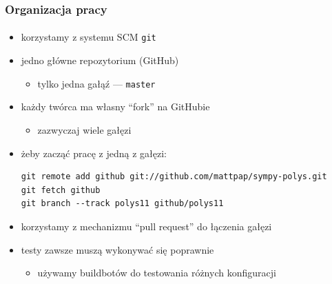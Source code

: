 \documentclass[10pt]{beamer}
\begin{document}
\begin{frame}[fragile]
    \frametitle{Organizacja pracy}
    \framesubtitle{}

    \begin{itemize}
        \item korzystamy z systemu SCM \texttt{git}
        \pause
        \item jedno główne repozytorium (GitHub)
            \begin{itemize}
                \item tylko jedna gałąź --- \texttt{master}
            \end{itemize}
        \item każdy twórca ma własny ``fork'' na GitHubie
            \begin{itemize}
                \item zazwyczaj wiele gałęzi
            \end{itemize}
        \pause
        \item żeby zacząć pracę z jedną z gałęzi:
            {\small
            \begin{verbatim}
git remote add github git://github.com/mattpap/sympy-polys.git
git fetch github
git branch --track polys11 github/polys11
            \end{verbatim}}
        \pause
        \item korzystamy z mechanizmu ``pull request'' do łączenia gałęzi
        \pause
        \item testy zawsze muszą wykonywać się poprawnie
            \begin{itemize}
                \item używamy buildbotów do testowania różnych konfiguracji
            \end{itemize}
    \end{itemize}
\end{frame}
\end{document}
